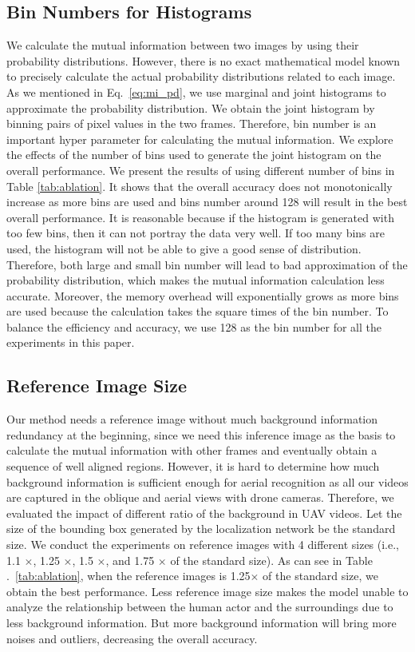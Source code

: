 \documentclass[10pt,twocolumn,letterpaper]{article}
\begin{document}
{\subsection{Bin Numbers for Histograms} 
We calculate the mutual information between two images by using their probability distributions. However, there is no exact mathematical model known to precisely calculate the actual probability distributions related to each image. As we mentioned in Eq.~\ref{eq:mi_pd},  we use marginal and joint histograms to approximate the probability distribution. We obtain the joint histogram by binning pairs of pixel values in the two frames. Therefore, bin number is an important hyper parameter for calculating the mutual information. We explore the effects of the number of bins used to generate the joint histogram on the overall performance. We present the results of using different number of bins in Table \ref{tab:ablation}. It shows that the overall accuracy does not monotonically increase as more bins are used and bins number around 128 will result in the best overall performance. It is reasonable because if the histogram is generated with too few bins, then it can not portray the data very well. If too many bins are used, the histogram will not be able to give a good sense of distribution. Therefore, both large and small bin number will lead to bad approximation of the probability distribution, which makes the mutual information calculation less accurate. Moreover, the memory overhead will exponentially grows as more bins are used because the calculation takes the square times of the bin number. To balance the efficiency and accuracy, we use 128 as the bin number for all the experiments in this paper.

\subsection{Reference Image Size}
Our method needs a reference image without much background information redundancy at the beginning, since we need this inference image as the basis to calculate the mutual information with other frames and eventually obtain a sequence of well aligned regions. However, it is hard to determine how much background information is sufficient enough for aerial recognition as all our videos are captured in the oblique and aerial views with drone cameras. Therefore, we evaluated the impact of different ratio of the background in UAV videos. Let the size of the bounding box generated by the localization network be the standard size. We conduct the experiments on reference images with 4 different sizes (i.e., 1.1 $\times$, 1.25 $\times$, 1.5 $\times$, and 1.75 $\times$ of the standard size). As can see in Table .~\ref{tab:ablation}, when the reference images is 1.25$\times$ of the standard size, we obtain the best performance. Less reference image size makes the model unable to analyze the relationship between the human actor and the surroundings due to less background information. But more background information will bring more noises and outliers, decreasing the overall accuracy.



}
\end{document}
